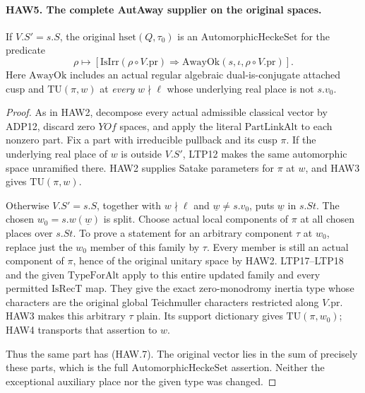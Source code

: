 \documentclass[11pt,a4paper]{article}
\numberwithin{equation}{section}
\theoremstyle{remark}\newtheorem{remark}[theorem]{Remark}
\begin{document}
\paragraph{HAW5. The complete AutAway supplier on the original spaces.}
\label{claim:HAW5}
If $V.S'=s.S$, the original $\mathrm{hset}(Q,\tau_0)$ is
an $\mathrm{AutomorphicHeckeSet}$ for the predicate
\[
 \rho\longmapsto
 [\mathrm{IsIrr}(\rho\circ V.\mathrm{pr})
       \Longrightarrow\mathrm{AwayOk}(s,\iota,
                                      \rho\circ V.\mathrm{pr})].
 \tag{HAW.7}
\]
Here $\mathrm{AwayOk}$ includes an actual regular algebraic
dual-is-conjugate attached cusp and $\mathrm{TU}(\pi,w)$
at \emph{every} $w\nmid\ell$ whose underlying real place
is not $s.v_0$.
\begin{proof}
As in HAW2, decompose every actual admissible classical vector
by ADP12, discard zero $YOf$ spaces, and apply the literal
$\mathrm{PartLinkAlt}$ to each nonzero part.  Fix a part with
irreducible pullback and its cusp $\pi$.  If the underlying
real place of $w$ is outside $V.S'$, LTP12 makes the same
automorphic space unramified there.  HAW2 supplies Satake
parameters for $\pi$ at $w$, and HAW3 gives
$\mathrm{TU}(\pi,w)$.

Otherwise $V.S'=s.S$, together with $w\nmid\ell$ and
$\underline w\ne s.v_0$, puts $\underline w$ in $s.St$.
The chosen $w_0=s.w(\underline w)$ is split.  Choose actual
local components of $\pi$ at all chosen places over $s.St$.
To prove a statement for an arbitrary component $\tau$ at
$w_0$, replace just the $w_0$ member of this family by $\tau$.
Every member is still an actual component of $\pi$, hence of
the original unitary space by HAW2.  LTP17--LTP18 and the
given $\mathrm{TypeForAlt}$ apply to this entire updated
family and every permitted $\mathrm{IsRecT}$ map.  They give
the exact zero-monodromy inertia type whose characters are
the original global Teichmuller characters restricted along
$V.\mathrm{pr}$.  HAW3 makes this arbitrary $\tau$ plain.
Its support dictionary gives $\mathrm{TU}(\pi,w_0)$; HAW4
transports that assertion to $w$.

Thus the same part has (HAW.7).  The original vector lies in
the sum of precisely these parts, which is the full
$\mathrm{AutomorphicHeckeSet}$ assertion.  Neither the
exceptional auxiliary place nor the given type was changed.
\end{proof}

\end{document}
